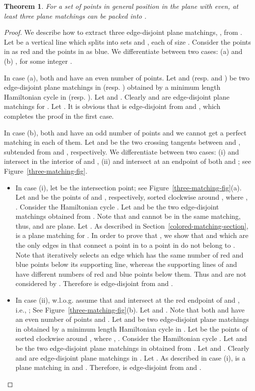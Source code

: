 \documentclass[11pt,a4paper]{article}
\newcommand{\M}[2]{\text{}}
\newcommand{\Tangent}[2]{\text{\sf Tangent}}
\newtheorem{theorem}{Theorem}
\begin{document}
\begin{theorem}
\label{3-matching-theorem}
For a set  of  points in general position in the plane with  even, at least three plane matchings can be packed into .
\end{theorem}
\begin{proof}
We describe how to extract three edge-disjoint plane matchings, , from . Let  be a vertical line which splits  into sets  and , each of size . Consider the points in  as red and the points in  as blue. We differentiate between two cases: (a)  and (b) , for some integer .

In case (a), both  and  have an even number of points. Let \M{1}{R} and \M{2}{R} (resp. \M{1}{B} and \M{2}{B}) be two edge-disjoint plane matchings in  (resp. ) obtained by a minimum length Hamiltonian cycle in  (resp. ). Let  and . Clearly  and  are edge-disjoint plane matchings for . Let . It is obvious that  is edge-disjoint from  and , which completes the proof in the first case.

In case (b), both  and  have an odd number of points and we cannot get a perfect matching in each of them. Let  and  be the two crossing tangents between  and , subtended from  and , respectively. We differentiate between two cases: (i)  and  intersect in the interior of  and , (ii)  and  intersect at an endpoint of both  and ; see Figure~\ref{three-matching-fig}.
\begin{itemize}
\item In case (i), let  be the intersection point; see Figure~\ref{three-matching-fig}(a). Let  and  be the points of  and , respectively, sorted clockwise around , where , . Consider the Hamiltonian cycle . Let  and  be the two edge-disjoint matchings obtained from . Note that  and  cannot be in the same matching, thus,  and  are plane. Let . As described in Section~\ref{colored-matching-section},  is a plane matching for . In order to prove that , we show that  and \textemdash which are the only edges in  that connect a point in  to a point in \textemdash do not belong to . Note that \Tangent{R}{B} iteratively selects an edge which has the same number of red and blue points below its supporting line, whereas the supporting lines of  and  have different numbers of red and blue points below them. Thus  and  are not considered by \Tangent{R}{B}. Therefore  is edge-disjoint from  and . 

\item In case (ii), w.l.o.g. assume that  and  intersect at the red endpoint of  and , i.e., ; See Figure~\ref{three-matching-fig}(b). Let  and . Note that both  and  have an even number of points and . Let \M{1}{R'} and \M{2}{R'} be two edge-disjoint plane matchings in  obtained by a minimum length Hamiltonian cycle in . Let  be the points of  sorted clockwise around , where , . Consider the Hamiltonian cycle . Let  and  be the two edge-disjoint plane matchings in  obtained from . Let  and . Clearly  and  are edge-disjoint plane matchings in . Let . As described in case (i),  is a plane matching in  and . Therefore,  is edge-disjoint from  and .
\end{itemize}
\end{proof}
\end{document}
